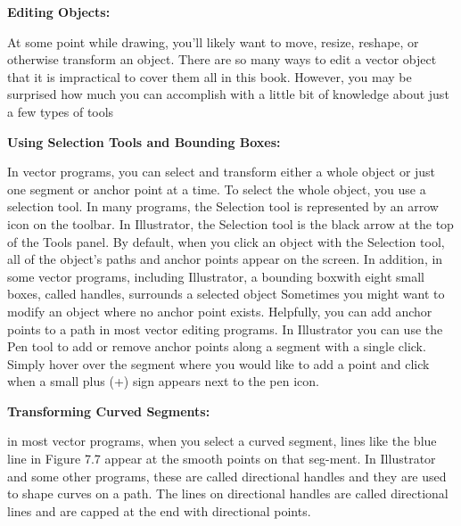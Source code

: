 \documentclass{report}
\begin{document}
    \bigbreak \noindent \bigbreak \noindent 
    \begin{large}
      \textbf{Editing Objects:}
    \end{large}
    \bigbreak \noindent 
    At some point while drawing, you’ll likely want to move, resize, reshape, or otherwise transform an object. There are so many ways to edit a vector object that it is impractical to cover them all in this book. However, you may be surprised how much you can accomplish with a little bit of knowledge about just a few types of tools

    \bigbreak \noindent \bigbreak \noindent 
    \begin{Large}
      \textbf{Using Selection Tools and Bounding Boxes:}
    \end{Large}
    \bigbreak \noindent 
    In vector programs, you can select and transform either a whole object or just one segment or anchor point at a time. To select the whole object, you use a selection tool. In many programs, the Selection tool is represented by an arrow icon on the toolbar. In Illustrator, the Selection tool is the black arrow at the top of the Tools panel. By default, when you click an object with the Selection tool, all of the object’s paths and anchor points appear on the screen.
    \bigbreak \noindent 
    In addition, in some vector programs, including Illustrator, a bounding boxwith eight small boxes, called handles, surrounds a selected object
    \bigbreak \noindent 
    \bigbreak \noindent 
    Sometimes you might want to modify an object where no anchor point exists. Helpfully, you can add anchor points to a path in most vector editing programs. In Illustrator you can use the Pen tool to add or remove anchor points along a segment with a single click. Simply hover over the segment where you would like to add a point and click when a small plus (+) sign appears next to the pen icon.

    \bigbreak \noindent \bigbreak \noindent 
    \begin{Large}
      \textbf{Transforming Curved Segments:}
    \end{Large}
    \bigbreak \noindent 
    in most vector programs, when you select a curved segment, lines like the blue line in Figure 7.7 appear at the smooth points on that seg-ment. In Illustrator and some other programs, these are called directional handles and they are used to shape curves on a path. The lines on directional handles are called directional lines and are capped at the end with directional points.
    \bigbreak \noindent 
\end{document}
